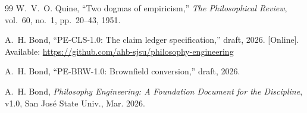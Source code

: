 \documentclass[journal]{IEEEtran}
\begin{document}
\begin{thebibliography}{99}
W.~V.~O. Quine, ``Two dogmas of empiricism,'' \emph{The Philosophical Review},
vol.~60, no.~1, pp.~20--43, 1951.

A.~H. Bond, ``PE-CLS-1.0: The claim ledger specification,'' draft, 2026.
[Online]. Available: \url{https://github.com/ahb-sjsu/philosophy-engineering}

A.~H. Bond, ``PE-BRW-1.0: Brownfield conversion,'' draft, 2026.

A.~H. Bond, \emph{Philosophy Engineering: A Foundation Document for the
Discipline}, v1.0, San Jos\'e State Univ., Mar. 2026.

\end{thebibliography}
\end{document}
